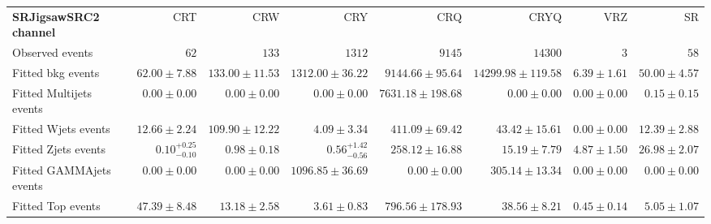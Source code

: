 

\begin{table}
\begin{center}
\setlength{\tabcolsep}{0.0pc}
{\tiny
\begin{tabular*}{\textwidth}{@{\extracolsep{\fill}}lrrrrrrr}
\noalign{\smallskip}\hline\noalign{\smallskip}
{\bf SRJigsawSRC2 channel}           & CRT            & CRW            & CRY            & CRQ            & CRYQ            & VRZ            & SR              \\[-0.05cm]
\noalign{\smallskip}\hline\noalign{\smallskip}
Observed events          & $62$              & $133$              & $1312$              & $9145$              & $14300$              & $3$              & $58$                    \\
\noalign{\smallskip}\hline\noalign{\smallskip}
Fitted bkg events         & $62.00 \pm 7.88$          & $133.00 \pm 11.53$          & $1312.00 \pm 36.22$          & $9144.66 \pm 95.64$          & $14299.98 \pm 119.58$          & $6.39 \pm 1.61$          & $50.00 \pm 4.57$              \\
\noalign{\smallskip}\hline\noalign{\smallskip}
        Fitted Multijets events         & $0.00 \pm 0.00$          & $0.00 \pm 0.00$          & $0.00 \pm 0.00$          & $7631.18 \pm 198.68$          & $0.00 \pm 0.00$          & $0.00 \pm 0.00$          & $0.15 \pm 0.15$              \\
        Fitted Wjets events         & $12.66 \pm 2.24$          & $109.90 \pm 12.22$          & $4.09 \pm 3.34$          & $411.09 \pm 69.42$          & $43.42 \pm 15.61$          & $0.00 \pm 0.00$          & $12.39 \pm 2.88$              \\
        Fitted Zjets events         & $0.10_{-0.10}^{+0.25}$          & $0.98 \pm 0.18$          & $0.56_{-0.56}^{+1.42}$          & $258.12 \pm 16.88$          & $15.19 \pm 7.79$          & $4.87 \pm 1.50$          & $26.98 \pm 2.07$              \\
        Fitted GAMMAjets events         & $0.00 \pm 0.00$          & $0.00 \pm 0.00$          & $1096.85 \pm 36.69$          & $0.00 \pm 0.00$          & $305.14 \pm 13.34$          & $0.00 \pm 0.00$          & $0.00 \pm 0.00$              \\
        Fitted Top events         & $47.39 \pm 8.48$          & $13.18 \pm 2.58$          & $3.61 \pm 0.83$          & $796.56 \pm 178.93$          & $38.56 \pm 8.21$          & $0.45 \pm 0.14$          & $5.05 \pm 1.07$              \\

\end{tabular*}}
\end{center}
\end{table}
